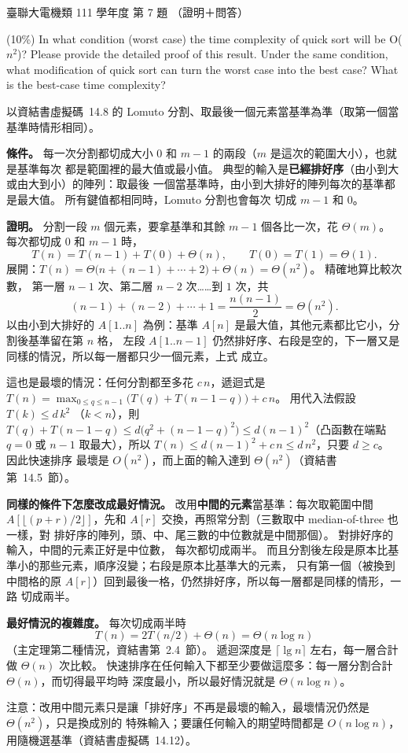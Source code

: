 \begin{pastexam}[label={px:ust-111-ee-ds-07}]{臺聯大電機類 111 學年度 第 7 題}
（證明＋問答）

(10\%) In what condition (worst case) the time complexity of quick sort will be O($n^2$)? Please
provide the detailed proof of this result. Under the same condition, what modification of quick sort
can turn the worst case into the best case? What is the best-case time complexity?
\end{pastexam}

\begin{pastsoln}
以資結書虛擬碼~14.8 的 Lomuto 分割、取最後一個元素當基準為準（取第一個當基準時情形相同）。

\textbf{條件。} 每一次分割都切成大小 $0$ 和 $m - 1$ 的兩段（$m$ 是這次的範圍大小），也就是基準每次
都是範圍裡的最大值或最小值。 典型的輸入是\textbf{已經排好序}（由小到大或由大到小）的陣列：取最後
一個當基準時，由小到大排好的陣列每次的基準都是最大值。 所有鍵值都相同時，Lomuto 分割也會每次
切成 $m - 1$ 和 $0$。

\textbf{證明。} 分割一段 $m$ 個元素，要拿基準和其餘 $m - 1$ 個各比一次，花 $\Theta(m)$。 每次都切成
$0$ 和 $m - 1$ 時，
\[
T(n) = T(n - 1) + T(0) + \Theta(n), \qquad T(0) = T(1) = \Theta(1).
\]
展開：$T(n) = \Theta\bigl(n + (n - 1) + \cdots + 2\bigr) + \Theta(n) = \Theta(n^2)$。 精確地算比較次數，
第一層 $n - 1$ 次、第二層 $n - 2$ 次……到 $1$ 次，共
\[
(n - 1) + (n - 2) + \cdots + 1 = \frac{n(n - 1)}{2} = \Theta(n^2).
\]
以由小到大排好的 $A[1..n]$ 為例：基準 $A[n]$ 是最大值，其他元素都比它小，分割後基準留在第 $n$ 格，
左段 $A[1..n-1]$ 仍然排好序、右段是空的，下一層又是同樣的情況，所以每一層都只少一個元素，上式
成立。

這也是最壞的情況：任何分割都至多花 $c\,n$，遞迴式是
$T(n) = \max_{0 \le q \le n-1}\bigl(T(q) + T(n - 1 - q)\bigr) + c\,n$。 用代入法假設 $T(k) \le d\,k^2$
（$k < n$），則 $T(q) + T(n-1-q) \le d\bigl(q^2 + (n-1-q)^2\bigr) \le d (n - 1)^2$（凸函數在端點
$q = 0$ 或 $n - 1$ 取最大），所以 $T(n) \le d(n-1)^2 + c\,n \le d\,n^2$，只要 $d \ge c$。 因此快速排序
最壞是 $O(n^2)$，而上面的輸入達到 $\Theta(n^2)$（資結書第~14.5~節）。

\textbf{同樣的條件下怎麼改成最好情況。} 改用\textbf{中間的元素}當基準：每次取範圍中間
$A[\lfloor (p + r)/2 \rfloor]$，先和 $A[r]$ 交換，再照常分割（三數取中 median-of-three 也一樣，對
排好序的陣列，頭、中、尾三數的中位數就是中間那個）。 對排好序的輸入，中間的元素正好是中位數，
每次都切成兩半。 而且分割後左段是原本比基準小的那些元素，順序沒變；右段是原本比基準大的元素，
只有第一個（被換到中間格的原 $A[r]$）回到最後一格，仍然排好序，所以每一層都是同樣的情形，一路
切成兩半。

\textbf{最好情況的複雜度。} 每次切成兩半時
\[
T(n) = 2T(n/2) + \Theta(n) = \Theta(n \log n)
\]
（主定理第二種情況，資結書第~2.4~節）。 遞迴深度是 $\lceil \lg n \rceil$ 左右，每一層合計做
$\Theta(n)$ 次比較。 快速排序在任何輸入下都至少要做這麼多：每一層分割合計 $\Theta(n)$，而切得最平均時
深度最小，所以最好情況就是 $\Theta(n \log n)$。

注意：改用中間元素只是讓「排好序」不再是最壞的輸入，最壞情況仍然是 $\Theta(n^2)$，只是換成別的
特殊輸入；要讓任何輸入的期望時間都是 $O(n \log n)$，用隨機選基準（資結書虛擬碼~14.12）。
\end{pastsoln}
